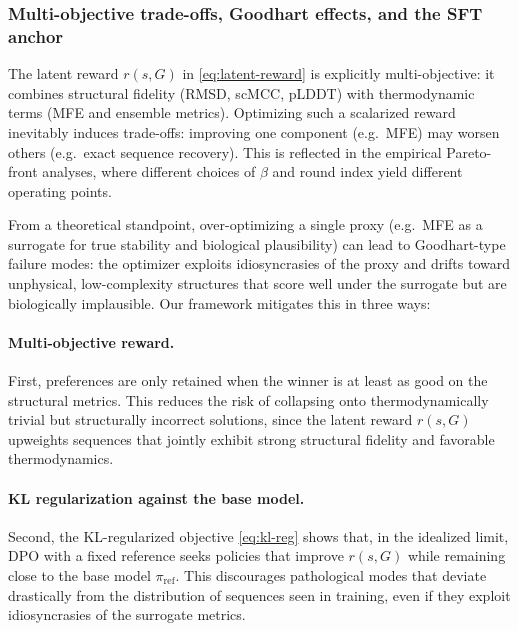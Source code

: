 {{\subsubsection{Multi-objective trade-offs, Goodhart effects, and the SFT anchor}

The latent reward $r(s,G)$ in \eqref{eq:latent-reward} is explicitly
multi-objective: it combines structural fidelity (RMSD, scMCC, pLDDT) with
thermodynamic terms (MFE and ensemble metrics). Optimizing such a scalarized
reward inevitably induces trade-offs: improving one component (e.g.\ MFE)
may worsen others (e.g.\ exact sequence recovery). This is reflected in the
empirical Pareto-front analyses, where different choices of $\beta$ and
round index yield different operating points.

From a theoretical standpoint, over-optimizing a single proxy (e.g.\ MFE as
a surrogate for true stability and biological plausibility) can lead to
Goodhart-type failure modes: the optimizer exploits idiosyncrasies of the
proxy and drifts toward unphysical, low-complexity structures that score
well under the surrogate but are biologically implausible. Our framework
mitigates this in three ways:

\paragraph{Multi-objective reward.}
First, preferences are only retained when the winner is at least as good on
the structural metrics. This reduces the risk of collapsing onto
thermodynamically trivial but structurally incorrect solutions, since the
latent reward $r(s,G)$ upweights sequences that jointly exhibit strong
structural fidelity and favorable thermodynamics.

\paragraph{KL regularization against the base model.}
Second, the KL-regularized objective \eqref{eq:kl-reg} shows that, in the
idealized limit, DPO with a fixed reference seeks policies that improve
$r(s,G)$ while remaining close to the base model $\pi_{\text{ref}}$. This
discourages pathological modes that deviate drastically from the
distribution of sequences seen in training, even if they exploit
idiosyncrasies of the surrogate metrics.

}}
